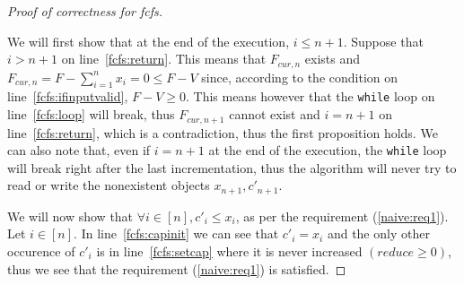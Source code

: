\begin{proof}[Proof of correctness for fcfs] \

   We will first show that at the end of the execution, $i \leq n+1$. Suppose that $i > n+1$ on line~\ref{fcfs:return}. This
   means that $F_{cur,n}$ exists and $F_{cur,n} = F - \sum\limits_{i=1}^{n}x_i = 0 \leq F - V$ since, according to the
   condition on line~\ref{fcfs:ifinputvalid}, $F - V \geq 0$. This means however that the \texttt{while} loop on
   line~\ref{fcfs:loop} will break, thus $F_{cur,n+1}$ cannot exist and $i = n + 1$ on line~\ref{fcfs:return}, which is a
   contradiction, thus the first proposition holds. We can also note that, even if $i = n + 1$ at the end of the execution,
   the \texttt{while} loop will break right after the last incrementation, thus the algorithm will never try to read or
   write the nonexistent objects $x_{n+1}, c'_{n+1}$.

   We will now show that $\forall i \in [n], c'_i \leq x_i$, as per the requirement (\ref{naive:req1}). Let $i \in [n]$.
   In line~\ref{fcfs:capinit} we can see that $c'_i = x_i$ and the only other occurence of $c'_i$ is in
   line~\ref{fcfs:setcap} where it is never increased $(reduce \geq 0)$, thus we see that the requirement (\ref{naive:req1})
   is satisfied.


\end{proof}
